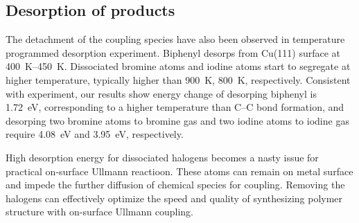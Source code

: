 \documentclass[%
 reprint,
 amsmath,amssymb,
 aps,
prb,
floatfix,
]{revtex4-2}
\begin{document}




\subsection{Desorption of products}

{\color{blue}
The detachment of the coupling species have also been observed in temperature programmed desorption experiment. Biphenyl desorps from Cu(111) surface at \SIrange{400}{450}{\kelvin}\cite{ullmann_104}. Dissociated bromine atoms and iodine atoms start to segregate at higher temperature, typically higher than \SI{900}{\kelvin}, \SI{800}{\kelvin}\cite{jacs2013, ullmann_104}, respectively.
Consistent with experiment, our results show energy change of desorping biphenyl is \SI{+1.72}{\electronvolt}, corresponding to a higher temperature than C--C bond formation, and desorping two bromine atoms to bromine gas and two iodine atoms to iodine gas require \SI{+4.08}{\electronvolt} and \SI{+3.95}{\electronvolt}, respectively. 

High desorption energy for dissociated halogens becomes a nasty issue for practical on-surface Ullmann reactioon. These atoms can remain on metal surface and impede the further diffusion of chemical species for coupling. Removing the halogens can effectively optimize the speed and quality of synthesizing polymer structure with on-surface Ullmann coupling.
}



\end{document}
